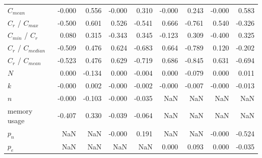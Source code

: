\begin{tabular}{lrrrrrrrr}
$C_{mean}$           &           -0.000 &         0.556 &           -0.000 &         0.310 &           -0.000 &         0.243 &           -0.000 &         0.583 \\
$C_r$ / $C_{max}$    &           -0.500 &         0.601 &            0.526 &        -0.541 &            0.666 &        -0.761 &            0.540 &        -0.326 \\
$C_{min}$ / $C_r$    &            0.080 &         0.315 &           -0.343 &         0.345 &           -0.123 &         0.309 &           -0.400 &         0.325 \\
$C_r$ / $C_{median}$ &           -0.509 &         0.476 &            0.624 &        -0.683 &            0.664 &        -0.789 &            0.120 &        -0.202 \\
$C_r$ / $C_{mean}$   &           -0.523 &         0.476 &            0.629 &        -0.719 &            0.686 &        -0.845 &            0.631 &        -0.694 \\
$N$                  &            0.000 &        -0.134 &            0.000 &        -0.004 &            0.000 &        -0.079 &            0.000 &         0.011 \\
$k$                  &           -0.000 &         0.002 &           -0.000 &        -0.002 &           -0.000 &        -0.007 &           -0.000 &        -0.013 \\
$n$                  &           -0.000 &        -0.103 &           -0.000 &        -0.035 &              NaN &           NaN &              NaN &           NaN \\
memory usage         &           -0.407 &         0.330 &           -0.039 &        -0.064 &              NaN &           NaN &              NaN &           NaN \\
$p_n$                &              NaN &           NaN &           -0.000 &         0.191 &              NaN &           NaN &           -0.000 &        -0.524 \\
$p_e$                &              NaN &           NaN &              NaN &           NaN &            0.000 &         0.093 &            0.000 &        -0.035 \\
\bottomrule
\end{tabular}
